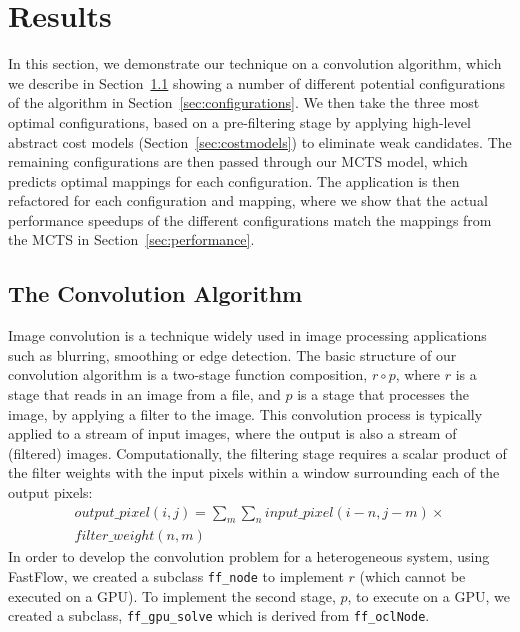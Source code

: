 \documentclass[smallextended]{svjour3}
\begin{document}

\section{Results} \label{sec:results}

In this section, we demonstrate our technique on a convolution algorithm, which we describe in Section~\ref{sec:convolution} showing 
a number of different potential configurations of the algorithm in Section~\ref{sec:configurations}. We then take the three most optimal configurations,
based on a pre-filtering stage by applying high-level abstract cost models (Section~\ref{sec:costmodels}) to eliminate weak candidates. The remaining configurations are then passed
through our MCTS model, which predicts optimal mappings for each configuration. The application is then refactored for each configuration and mapping, where
we show that the actual performance speedups of the different configurations match the mappings from the MCTS in Section~\ref{sec:performance}.

\subsection{The Convolution Algorithm} \label{sec:convolution}
\noindent
Image convolution is a technique widely used in image processing applications such as blurring, smoothing
or edge detection. 
The basic structure of our convolution algorithm is a two-stage function composition, $ r \circ p $, where
$r$ is a stage that reads in an image from a file, and $p$ is a stage that processes the image, by applying a filter to the image. This convolution process is typically applied to a stream of input images, where the output is also a stream of (filtered) images.
Computationally, the filtering stage requires a scalar product of the filter weights with the input pixels within a window surrounding
each of the output pixels:
\begin{multline}
\label{eqn:01}
output\_pixel(i,j)=\sum_{m}\sum_{n} input\_pixel(i-n,j-m)\times\\
filter\_weight(n,m){}
\end{multline}
In order to develop the convolution problem for a
heterogeneous system, using FastFlow, we created a subclass \texttt{ff\_node} to implement $r$ (which cannot be executed on a GPU).
To implement the second stage, $p$, to execute on a GPU, we created a subclass, \texttt{ff\_gpu\_solve} which is derived from
\texttt{ff\_oclNode}. %
\end{document}
